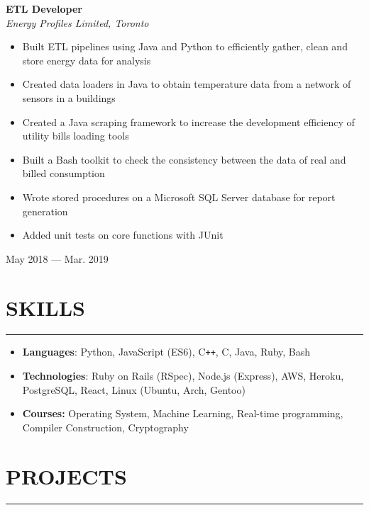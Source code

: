 \documentclass[9pt]{extarticle}
\begin{document}
\begin{minipage}[t]{0.8\linewidth}
\begin{flushleft}
\textbf{ETL Developer}\\
\textit{Energy Profiles Limited, Toronto}
\begin{itemize}
	\item Built ETL pipelines using Java and Python
		to efficiently gather, clean and
		store energy data for analysis
	\item Created data loaders in Java
		to obtain temperature data from a network of sensors in
		a buildings
	\item Created a Java scraping framework to increase
		the development efficiency of utility bills loading tools
	\item Built a Bash toolkit to check the consistency
		between the data of real and billed consumption
	\item Wrote stored procedures on a Microsoft SQL Server database for
		report generation
	\item Added unit tests on core functions with JUnit
\end{itemize}
\end{flushleft}
\end{minipage}
\begin{minipage}[t]{0.19\linewidth}
\begin{flushright}
May 2018 --- Mar. 2019
\end{flushright}
\end{minipage}

\vfill

\section*{\large{SKILLS}}
\rule[1em]{\textwidth}{0.3pt}
\begin{itemize}
	\item \textbf{Languages}:
		Python,
		JavaScript (ES6),
		C\texttt{++}, C,
		Java, Ruby, Bash
	\item \textbf{Technologies}:
		Ruby on Rails (RSpec),
		Node.js (Express),
		AWS, Heroku,
		PostgreSQL,
		React,
		Linux (Ubuntu, Arch, Gentoo)
	\item \textbf{Courses:}
		Operating System, Machine Learning, Real-time programming,
		Compiler Construction, Cryptography
\end{itemize}

\vfill

\section*{\large{PROJECTS}}
\rule[1em]{\textwidth}{0.3pt}
\end{document}
